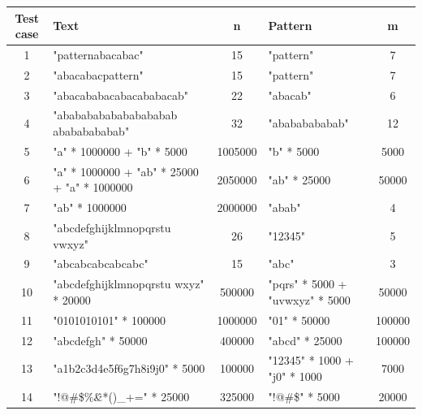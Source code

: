 \documentclass[11pt]{article}
\begin{document}
                \begin{table}[H]
                    \centering
                        \begin{tabularx}{\textwidth}{|c|X|c|X|c|}
                            \hline
                            \textbf{Test case} & \textbf{Text} & \textbf{n} & \textbf{Pattern} & \textbf{m} \\
                            \hline
                            1 & "patternabacabac" & 15 & "pattern" & 7 \\
                            \hline
                            2 & "abacabacpattern" & 15 & "pattern" & 7 \\
                            \hline
                            3 & "abacababacabacababacab" & 22 & "abacab" & 6 \\
                            \hline
                            4 & "abababababababababab abababababab" & 32 & "abababababab" & 12 \\
                            \hline
                            5 & "a" * 1000000 + "b" * 5000 & 1005000 & "b" * 5000 & 5000 \\
                            \hline
                            6 & "a" * 1000000 + "ab" * 25000 + "a" * 1000000 & 2050000 & "ab" * 25000 & 50000 \\
                            \hline
                            7 & "ab" * 1000000 & 2000000 & "abab" & 4 \\
                            \hline
                            8 & "abcdefghijklmnopqrstu vwxyz" & 26 & "12345" & 5 \\
                            \hline
                            9 & "abcabcabcabcabc" & 15 & "abc" & 3 \\
                            \hline
                            10 & "abcdefghijklmnopqrstu wxyz" * 20000 & 500000 & "pqrs" * 5000 + "uvwxyz" * 5000 & 50000 \\
                            \hline
                            11 & "0101010101" * 100000 & 1000000 & "01" * 50000 & 100000 \\
                            \hline
                            12 & "abcdefgh" * 50000 & 400000 & "abcd" * 25000 & 100000 \\
                            \hline
                            13 & "a1b2c3d4e5f6g7h8i9j0" * 5000 & 100000 & "12345" * 1000 + "j0" * 1000 & 7000 \\
                            \hline
                            14 & "!@#\$\%\^\&*()\_+=" * 25000 & 325000 & "!@#\$" * 5000 & 20000 \\

\end{tabularx}
\end{table}
\end{document}
